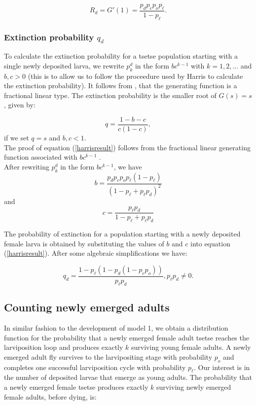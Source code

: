 \documentclass[smallextended]{svjour3}
\begin{document}
\begin{equation}
\label{larvareproductiveNum}
R_{d} = G'(1) = \frac{p_{d}p_{e}p_{o}p_\ell}{1-p_\ell}.
\end{equation}  



\subsubsection{Extinction probability  $q_{d}$}

To calculate the extinction probability for a tsetse population starting with a single newly deposited larva, we rewrite $p_{k}^{d}$ in the form $bc^{k-1}$ with $k =1,2,...$ and $b,c > 0$ (this is to allow us to follow the proceedure used by Harris \cite{Harris1965} to calculate the extinction probability). It follows from  \cite{Harris1965}, that the generating function is a fractional linear type. The extinction probability is the smaller root of $G(s)=s$, given by: 

\begin{equation}
\label{harrisresult}
q = \frac{1 - b -c}{c(1-c)},
\end{equation}
if we set $q = s$ and  $b, c < 1$.\\

The proof of equation (\ref{harrisresult}) follows from the fractional linear generating function associated with $bc^{k-1}$ \cite{Harris1965}. \\

After rewriting $p_{k}^{d}$ in the form $bc^{k-1}$, we have  $$b = \frac{p_{d}p_{e}p_{o}p_\ell(1-p_\ell)}{(1-p_\ell + p_\ell p_d)^2}$$ and $$c = \frac{p_\ell p_d}{1-p_\ell + p_\ell p_d}$$ 

The probability of extinction for a population starting with a newly deposited  female larva is obtained by substituting the values of $b$ and $c$ into equation (\ref{harrisresult}). After some algebraic simplifications we have:

\begin{equation}
\label{extictionLarva}
q_{d} = \frac{1-p_{\ell}(1 - p_{d}(1 - p_{e}p_{o}))}{p_{\ell}p_{d}}, p_{\ell}p_{d} \neq 0.
\end{equation}

\subsection{Counting newly emerged adults}

In similar fashion to the development of model 1, we obtain a distribution function for the probability that a newly emerged female adult tsetse reaches the larviposition loop and produces exactly $k$ surviving young female adults.
A newly emerged adult fly survives to the larvipositing stage  with probability $p_{o}$  and  completes one successful larviposition cycle with probability $p_{\ell}$. Our interest is in the number of deposited larvae that emerge as young adults. The probability that a newly emerged female tsetse produces exactly $k$ surviving newly emerged female adults, before dying, is: 
\end{document}
